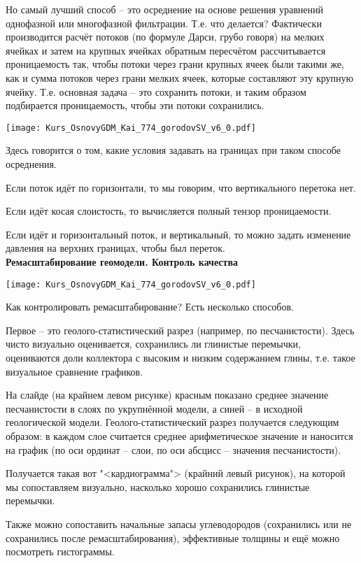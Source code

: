 Но самый лучший способ -- это осреднение на основе решения уравнений однофазной или многофазной фильтрации.
Т.е. что делается?
Фактически производится расчёт потоков (по формуле Дарси, грубо говоря) на мелких ячейках и затем на крупных ячейках обратным пересчётом рассчитывается проницаемость так, чтобы потоки через грани крупных ячеек были такими же, как и сумма потоков через грани мелких ячеек, которые составляют эту крупную ячейку. Т.е. основная задача -- это сохранить потоки, и таким образом подбирается проницаемость, чтобы эти потоки сохранились.

\texttt{[image: Kurs\_OsnovyGDM\_Kai\_774\_gorodovSV\_v6\_0.pdf]}

Здесь говорится о том, какие условия задавать на границах при таком способе осреднения.

Если поток идёт по горизонтали, то мы говорим, что вертикального перетока нет.

Если идёт косая слоистость, то вычисляется полный тензор проницаемости.

Если идёт и горизонтальный поток, и вертикальный, то можно задать изменение давления на верхних границах, чтобы был переток.
\\

\textbf{Ремасштабирование геомодели. Контроль качества}

\texttt{[image: Kurs\_OsnovyGDM\_Kai\_774\_gorodovSV\_v6\_0.pdf]}

Как контролировать ремасштабирование?
Есть несколько способов.

Первое -- это геолого-статистический разрез (например, по песчанистости).
Здесь чисто визуально оценивается, сохранились ли глинистые перемычки, оцениваются доли коллектора с высоким и низким содержанием глины, т.е. такое визуальное сравнение графиков.

На слайде (на крайнем левом рисунке) красным показано среднее значение песчанистости в слоях по укрупнённой модели, а синей -- в исходной геологической модели.
Геолого-статистический разрез получается следующим образом: в каждом слое считается среднее арифметическое значение и наносится на график (по оси ординат -- слои, по оси абсцисс -- значения песчанистости).

Получается такая вот "<кардиограмма"> (крайний левый рисунок), на которой мы сопоставляем визуально, насколько хорошо сохранились глинистые перемычки.

Также можно сопоставить начальные запасы углеводородов (сохранились или не сохранились после ремасштабирования), эффективные толщины и ещё можно посмотреть гистограммы.


